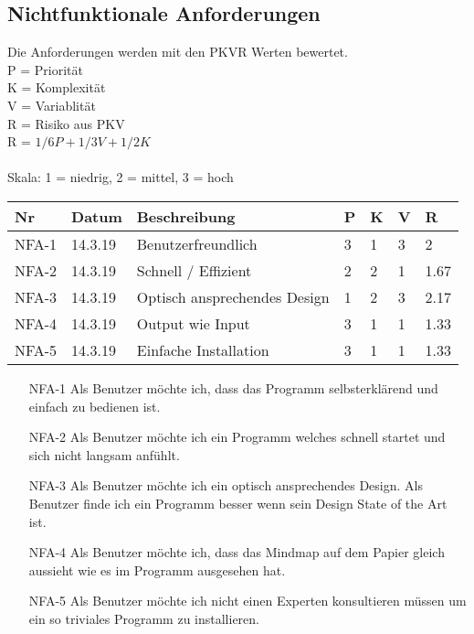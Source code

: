 \documentclass[a4paper,parskip]{scrartcl}
\begin{document}
\subsection{Nichtfunktionale Anforderungen}
Die Anforderungen werden mit den PKVR Werten bewertet. \\
P = Priorität  \\
K = Komplexität \\
V = Variablität \\
R = Risiko aus PKV \\ 
R = \(1/6P+1/3V+1/2K\) \\  
\\
Skala: 1 = niedrig, 2 = mittel, 3 = hoch \\


\begin{table}[h]

\begin{tabular}{|l|l|l|l|l|l|l|}

\hline
Nr  & Datum   & Beschreibung                 & P & K & V & R \\ \hline
NFA-1 & 14.3.19 & Benutzerfreundlich           & 3 & 1 & 3 & \cellcolor{yellow!20}2 \\\hline
NFA-2 & 14.3.19 & Schnell / Effizient          & 2 & 2 & 1 & \cellcolor{yellow!20}1.67 \\\hline
NFA-3 & 14.3.19 & Optisch ansprechendes Design & 1 & 2 & 3 & \cellcolor{red!20}2.17 \\\hline
NFA-4 & 14.3.19 & Output wie Input             & 3 & 1 & 1 & \cellcolor{green!20}1.33 \\\hline
NFA-5 & 14.3.19 & Einfache Installation        & 3 & 1 & 1 & \cellcolor{green!20}1.33 \\\hline
\end{tabular}
\end{table}
\begin{itemize}
\item[NFA-1]	Als Benutzer möchte ich, dass das Programm selbsterklärend und einfach zu bedienen ist. 
\item[NFA-2]	Als Benutzer möchte ich ein Programm welches schnell startet und sich nicht langsam anfühlt. 
\item[NFA-3]	Als Benutzer möchte ich ein optisch ansprechendes Design. Als Benutzer finde ich ein Programm besser wenn sein Design State of the Art ist. 
\item[NFA-4]	Als Benutzer möchte ich, dass das Mindmap auf dem Papier gleich aussieht wie es im Programm ausgesehen hat. 
\item[NFA-5]	Als Benutzer möchte ich nicht einen Experten konsultieren müssen um ein so triviales Programm zu installieren. 
\end{itemize}
\end{document}
